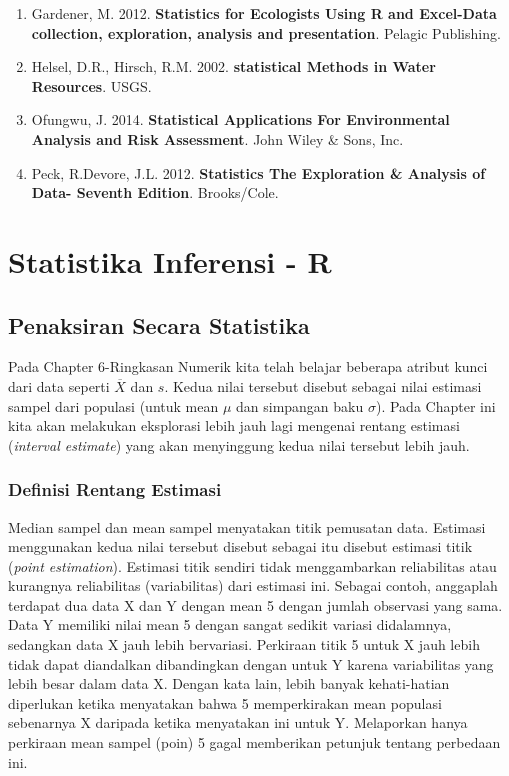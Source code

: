 \documentclass[]{book}
\providecommand{\tightlist}{%
  \setlength{\itemsep}{0pt}\setlength{\parskip}{0pt}}
\begin{document}
\begin{enumerate}
\def\labelenumi{\arabic{enumi}.}
\tightlist
\item
  Gardener, M. 2012. \textbf{Statistics for Ecologists Using R and
  Excel-Data collection, exploration, analysis and presentation}.
  Pelagic Publishing.
\item
  Helsel, D.R., Hirsch, R.M. 2002. \textbf{statistical Methods in Water
  Resources}. USGS.
\item
  Ofungwu, J. 2014. \textbf{Statistical Applications For Environmental
  Analysis and Risk Assessment}. John Wiley \& Sons, Inc.
\item
  Peck, R.Devore, J.L. 2012. \textbf{Statistics The Exploration \&
  Analysis of Data- Seventh Edition}. Brooks/Cole.
\end{enumerate}

\part*{Statistika Inferensi -
R}\label{part-statistika-inferensi---r}

\chapter{Penaksiran Secara
Statistika}\label{penaksiran-secara-statistika}

Pada Chapter 6-Ringkasan Numerik kita telah belajar beberapa atribut
kunci dari data seperti \(\overline{X}\) dan \(s\). Kedua nilai tersebut
disebut sebagai nilai estimasi sampel dari populasi (untuk mean \(\mu\)
dan simpangan baku \(\sigma\)). Pada Chapter ini kita akan melakukan
eksplorasi lebih jauh lagi mengenai rentang estimasi (\emph{interval
estimate}) yang akan menyinggung kedua nilai tersebut lebih jauh.

\section{Definisi Rentang Estimasi}\label{definisi-rentang-estimasi}

Median sampel dan mean sampel menyatakan titik pemusatan data. Estimasi
menggunakan kedua nilai tersebut disebut sebagai itu disebut estimasi
titik (\emph{point estimation}). Estimasi titik sendiri tidak
menggambarkan reliabilitas atau kurangnya reliabilitas (variabilitas)
dari estimasi ini. Sebagai contoh, anggaplah terdapat dua data X dan Y
dengan mean 5 dengan jumlah observasi yang sama. Data Y memiliki nilai
mean 5 dengan sangat sedikit variasi didalamnya, sedangkan data X jauh
lebih bervariasi. Perkiraan titik 5 untuk X jauh lebih tidak dapat
diandalkan dibandingkan dengan untuk Y karena variabilitas yang lebih
besar dalam data X. Dengan kata lain, lebih banyak kehati-hatian
diperlukan ketika menyatakan bahwa 5 memperkirakan mean populasi
sebenarnya X daripada ketika menyatakan ini untuk Y. Melaporkan hanya
perkiraan mean sampel (poin) 5 gagal memberikan petunjuk tentang
perbedaan ini.
\end{document}
